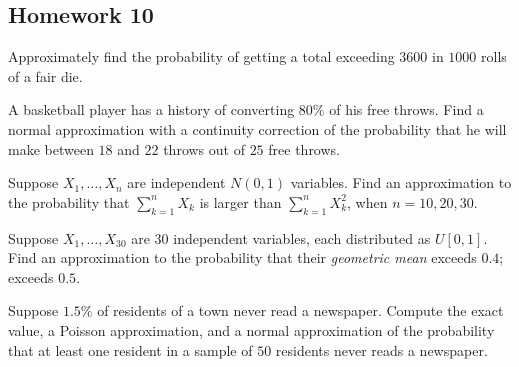 \subsection{Homework 10}
\begin{problem}[Handout 14, \# 5]
  Approximately find the probability of getting a total exceeding
  \(\num{3600}\) in \(\num{1000}\) rolls of a fair die.
\end{problem}
\begin{solution}

\end{solution}

\begin{problem}[Handout 14, \# 6]
  A basketball player has a history of converting \(80\%\) of his free
  throws. Find a normal approximation with a continuity correction of the
  probability that he will make between \(18\) and \(22\) throws out of
  \(25\) free throws.
\end{problem}
\begin{solution}

\end{solution}

\begin{problem}[Handout 14, \# 7]
  Suppose \(X_1,\dotsc,X_n\) are independent \(N(0,1)\)
  variables. Find an approximation to the probability that
  \(\sum_{k=1}^n X_k\) is larger than \(\sum_{k=1}^n X_k^2\), when
  \(n=10,20,30\).
\end{problem}
\begin{solution}

\end{solution}

\begin{problem}
  Suppose \(X_1,\dotsc,X_{30}\) are \(30\) independent variables, each
  distributed as \(U[0,1]\). Find an approximation to the probability that
  their \emph{geometric mean} exceeds \(0.4\); exceeds \(0.5\).
\end{problem}
\begin{solution}

\end{solution}

\begin{problem}
  Suppose \(1.5\%\) of residents of a town never read a newspaper. Compute
  the exact value, a Poisson approximation, and a normal approximation of
  the probability that at least one resident in a sample of \(50\)
  residents never reads a newspaper.
\end{problem}
\begin{solution}

\end{solution}

